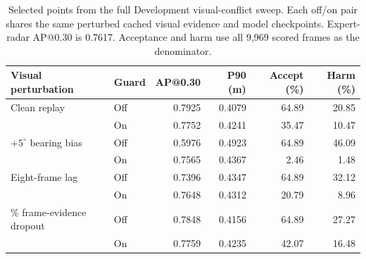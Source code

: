 \begin{table}[t]
\centering\small
\caption{Selected points from the full Development visual-conflict sweep. Each off/on pair shares the same perturbed cached visual evidence and model checkpoints. Expert-radar AP@0.30 is 0.7617. Acceptance and harm use all 9,969 scored frames as the denominator.}
\label{tab:visual-conflict}
\begin{tabular*}{\textwidth}{@{\extracolsep{\fill}}llrrrr@{}}
\toprule
Visual perturbation & Guard & AP@0.30 & P90 (m) & Accept (\%) & Harm (\%)\\
\midrule
Clean replay &Off&0.7925&0.4079&64.89&20.85\\
 &On&0.7752&0.4241&35.47&10.47\\
\addlinespace
$+5^\circ$ bearing bias &Off&0.5976&0.4923&64.89&46.09\\
 &On&0.7565&0.4367&2.46&1.48\\
\addlinespace
Eight-frame lag &Off&0.7396&0.4347&64.89&32.12\\
 &On&0.7648&0.4312&20.79&8.96\\
\addlinespace
50\% frame-evidence dropout &Off&0.7848&0.4156&64.89&27.27\\
 &On&0.7759&0.4235&42.07&16.48\\
\bottomrule
\end{tabular*}
\end{table}

